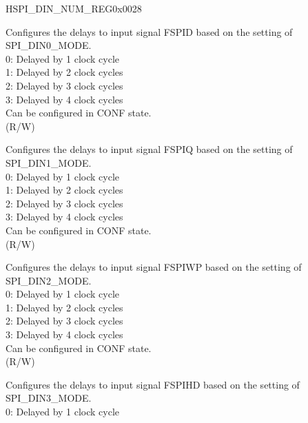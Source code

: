 \begin{register}{H}{SPI\_DIN\_NUM\_REG}{0x0028}\label{regdesc:SPIDINNUMREG}
%
%
%
%
%
%
%
%
%
\regnewline%
\begin{regdesc}\begin{reglist}
\label{fielddesc:SPIDIN0NUM}\item [SPI\_DIN0\_NUM] Configures the delays to input signal FSPID based on the setting of SPI\_DIN0\_MODE.\\
0: Delayed by 1 clock cycle\\
1: Delayed by 2 clock cycles\\
2: Delayed by 3 clock cycles\\
3: Delayed by 4 clock cycles\\
Can be configured in CONF state.\\ (R/W)
\label{fielddesc:SPIDIN1NUM}\item [SPI\_DIN1\_NUM] Configures the delays to input signal FSPIQ based on the setting of SPI\_DIN1\_MODE.\\
0: Delayed by 1 clock cycle\\
1: Delayed by 2 clock cycles\\
2: Delayed by 3 clock cycles\\
3: Delayed by 4 clock cycles\\
Can be configured in CONF state.\\ (R/W)
\label{fielddesc:SPIDIN2NUM}\item [SPI\_DIN2\_NUM] Configures the delays to input signal FSPIWP based on the setting of SPI\_DIN2\_MODE.\\
0: Delayed by 1 clock cycle\\
1: Delayed by 2 clock cycles\\
2: Delayed by 3 clock cycles\\
3: Delayed by 4 clock cycles\\
Can be configured in CONF state.\\ (R/W)
\label{fielddesc:SPIDIN3NUM}\item [SPI\_DIN3\_NUM] Configures the delays to input signal FSPIHD based on the setting of SPI\_DIN3\_MODE.\\
0: Delayed by 1 clock cycle\\

\end{reglist}
\end{regdesc}
\end{register}
